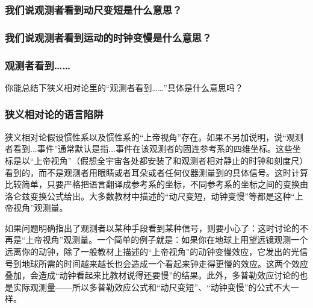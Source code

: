 \documentclass[CJK,13pt]{beamer}
\begin{document}
\begin{frame}
  \frametitle{我们说观测者看到动尺变短是什么意思？}
  
  
\end{frame}


\begin{frame}
  \frametitle{我们说观测者看到运动的时钟变慢是什么意思？}
  
\end{frame}


\begin{frame}
  \frametitle{观测者看到……}
  
  
  你能总结下狭义相对论里的“观测者看到……”具体是什么意思吗？
  
\end{frame}


\begin{frame}
  \frametitle{狭义相对论的语言陷阱}
  {\small
  \bitem
\item{狭义相对论假设惯性系以及惯性系的“上帝视角”存在。如果不另加说明，说“观测者看到...事件”通常默认是指...事件在该观测者的固连参考系的四维坐标。这些坐标是以“上帝视角”（假想全宇宙各处都安装了和观测者相对静止的时钟和刻度尺）看到的，而不是观测者用眼睛或者耳朵或者任何仪器测量到的具体信号。这时计算比较简单，只要严格把语言翻译成参考系的坐标，不同参考系的坐标之间的变换由洛仑兹变换公式给出。大多数教材中描述的“动尺变短，动钟变慢”等都是这种“上帝视角”观测量。}  
\item{如果问题明确指出了观测者以某种手段看到某种信号，则要小心了：这时讨论的不再是“上帝视角”观测量。一个简单的例子就是：如果你在地球上用望远镜观测一个远离你的动钟，除了一般教材上描述的“上帝视角”的动钟变慢效应，它发出的光信号到地球所需的时间越来越长也会造成一个看起来钟走得更慢的效应。这两个效应叠加，会造成“动钟看起来比教材说得还要慢”的结果。此外，多普勒效应讨论的也是实际观测量——所以多普勒效应公式和“动尺变短”、“动钟变慢”的公式不大一样。}
  \eitem
  }
\end{frame}




\end{document}
